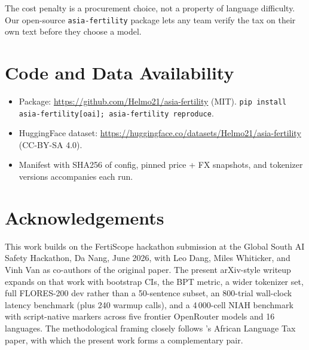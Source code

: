 \documentclass[11pt,a4paper]{article}
\begin{document}
The cost penalty is a procurement choice, not a property of language difficulty. Our open-source \texttt{asia-fertility} package lets any team verify the tax on their own text before they choose a model.

\section*{Code and Data Availability}
\begin{itemize}
    \item Package: \url{https://github.com/Helmo21/asia-fertility} (MIT). \texttt{pip install asia-fertility[oai]; asia-fertility reproduce}.
    \item HuggingFace dataset: \url{https://huggingface.co/datasets/Helmo21/asia-fertility} (CC-BY-SA 4.0).
    \item Manifest with SHA256 of config, pinned price + FX snapshots, and tokenizer versions accompanies each run.
\end{itemize}

\section*{Acknowledgements}
This work builds on the FertiScope hackathon submission at the Global South AI Safety Hackathon, Da Nang, June 2026, with Leo Dang, Miles Whiticker, and Vinh Van as co-authors of the original paper. The present arXiv-style writeup expands on that work with bootstrap CIs, the BPT metric, a wider tokenizer set, full FLORES-200 dev rather than a 50-sentence subset, an 800-trial wall-clock latency benchmark (plus 240 warmup calls), and a 4\,000-cell NIAH benchmark with script-native markers across five frontier OpenRouter models and 16 languages. The methodological framing closely follows \citet{somide2026african}'s African Language Tax paper, with which the present work forms a complementary pair.



\end{document}
